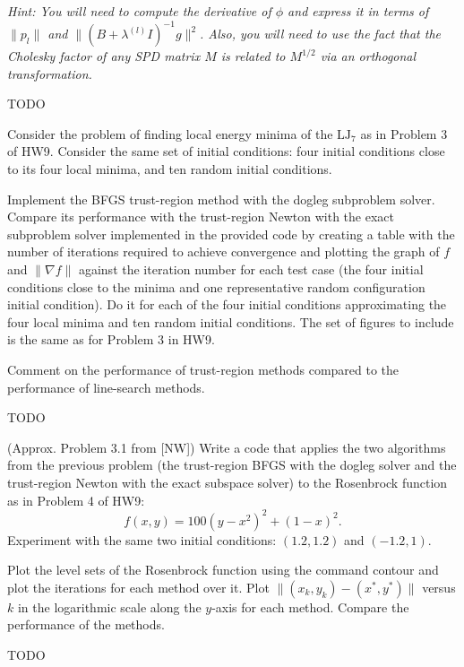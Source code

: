 \documentclass{../kin_math}
\begin{document}
\begin{questions}
  \emph{Hint: You will need to compute the derivative of $\phi$ and express it in terms of $\lVert p_l \rVert$ and $\lVert (B + \lambda^{(l)} I)^{-1} g \rVert^2$. Also, you will need to use the fact that the Cholesky factor of any SPD matrix $M$ is related to $M^{1 / 2}$ via an orthogonal transformation.}
  \begin{solution}
    TODO
  \end{solution}

  \question Consider the problem of finding local energy minima of the $\text{LJ}_7$ as in Problem 3 of HW9. Consider the same set of initial conditions: four initial conditions close to its four local minima, and ten random initial conditions.

  Implement the BFGS trust-region method with the dogleg subproblem solver. Compare its performance with the trust-region Newton with the exact subproblem solver implemented in the provided code by creating a table with the number of iterations required to achieve convergence and plotting the graph of $f$ and $\lVert \nabla f \rVert$ against the iteration number for each test case (the four initial conditions close to the minima and one representative random configuration initial condition). Do it for each of the four initial conditions approximating the four local minima and ten random initial conditions. The set of figures to include is the same as for Problem 3 in HW9.
  
  Comment on the performance of trust-region methods compared to the performance of line-search methods.
  \begin{solution}
    TODO
  \end{solution}

  \question (Approx. Problem 3.1 from [NW]) Write a code that applies the two algorithms from the previous problem (the trust-region BFGS with the dogleg solver and the trust-region Newton with the exact subspace solver) to the Rosenbrock function as in Problem 4 of HW9:
  \begin{equation}
    f(x, y) = 100(y - x^2)^2 + (1 - x)^2.
  \end{equation}
  Experiment with the same two initial conditions: $(1.2, 1.2)$ and $(-1.2, 1)$.

  Plot the level sets of the Rosenbrock function using the command contour and plot the iterations for each method over it. Plot $\lVert (x_k, y_k) - (x^*, y^*) \rVert$ versus $k$ in the logarithmic scale along the $y$-axis for each method. Compare the performance of the methods.
  \begin{solution}
    TODO
  \end{solution}
\end{questions}
\end{document}
